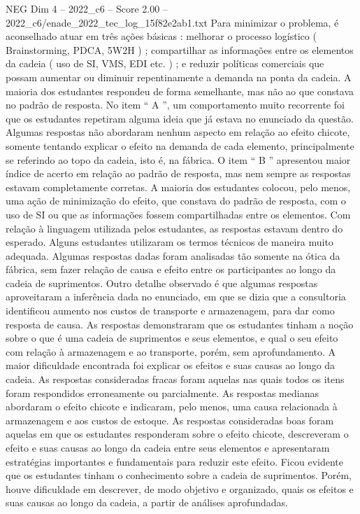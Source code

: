 \begin{textsample}{NEG Dim 4 – 2022\_c6 – Score 2.00 – 2022\_c6/enade\_2022\_tec\_log\_15f82e2ab1.txt}
Para minimizar o problema, é aconselhado atuar em três ações básicas : melhorar o processo logístico ( Brainstorming, PDCA, 5W2H ) ; compartilhar as informações entre os elementos da cadeia ( uso de SI, VMS, EDI etc. ) ; e reduzir políticas comerciais que possam aumentar ou diminuir repentinamente a demanda na ponta da cadeia.
A maioria dos estudantes respondeu de forma semelhante, mas não ao que constava no padrão de resposta.
No item “ A ”, um comportamento muito recorrente foi que os estudantes repetiram alguma ideia que já estava no enunciado da questão.
Algumas respostas não abordaram nenhum aspecto em relação ao efeito chicote, somente tentando explicar o efeito na demanda de cada elemento, principalmente se referindo ao topo da cadeia, isto é, na fábrica.
O item “ B ” apresentou maior índice de acerto em relação ao padrão de resposta, mas nem sempre as respostas estavam completamente corretas.
A maioria dos estudantes colocou, pelo menos, uma ação de minimização do efeito, que constava do padrão de resposta, com o uso de SI ou que as informações fossem compartilhadas entre os elementos.
Com relação à linguagem utilizada pelos estudantes, as respostas estavam dentro do esperado.
Alguns estudantes utilizaram os termos técnicos de maneira muito adequada.
Algumas respostas dadas foram analisadas tão somente na ótica da fábrica, sem fazer relação de causa e efeito entre os participantes ao longo da cadeia de suprimentos.
Outro detalhe observado é que algumas respostas aproveitaram a inferência dada no enunciado, em que se dizia que a consultoria identificou aumento nos custos de transporte e armazenagem, para dar como resposta de causa.
As respostas demonstraram que os estudantes tinham a noção sobre o que é uma cadeia de suprimentos e seus elementos, e qual o seu efeito com relação à armazenagem e ao transporte, porém, sem aprofundamento.
A maior dificuldade encontrada foi explicar os efeitos e suas causas ao longo da cadeia.
As respostas consideradas fracas foram aquelas nas quais todos os itens foram respondidos erroneamente ou parcialmente.
As respostas medianas abordaram o efeito chicote e indicaram, pelo menos, uma causa relacionada à armazenagem e aos custos de estoque.
As respostas consideradas boas foram aquelas em que os estudantes responderam sobre o efeito chicote, descreveram o efeito e suas causas ao longo da cadeia entre seus elementos e apresentaram estratégias importantes e fundamentais para reduzir este efeito.
Ficou evidente que os estudantes tinham o conhecimento sobre a cadeia de suprimentos.
Porém, houve dificuldade em descrever, de modo objetivo e organizado, quais os efeitos e suas causas ao longo da cadeia, a partir de análises aprofundadas.

\end{textsample}
